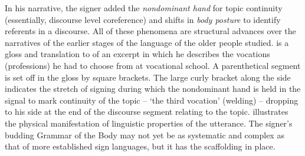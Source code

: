 \documentclass[output=paper]{langsci/langscibook}
\begin{document}
   In his narrative, the signer added the \textit{nondominant hand} for topic continuity (essentially, discourse level coreference) and shifts in \textit{body posture} to identify referents in a discourse.  All of these phenomena are structural advances over the narratives of the earlier stages of the language of the older people studied.   is a gloss and translation to  of an excerpt in which he describes the vocations (professions) he had to choose from at vocational school. A parenthetical segment is set off in the gloss by square brackets.  The large curly bracket along the side indicates the stretch of signing during which the nondominant hand is held in the signal to mark continuity of the topic -- ‘the third vocation’ (welding) -- dropping to his side at the end of the discourse segment relating to the topic.  illustrates the physical manifestation of linguistic properties of the utterance.  The signer’s budding Grammar of the Body  may not yet be as systematic and complex as that of more established sign languages,  but it has the scaffolding in place. 
\end{document}
